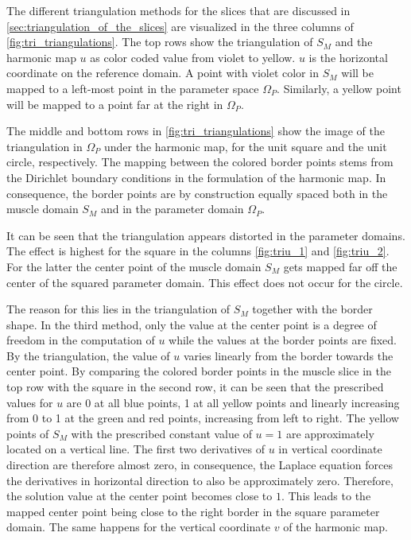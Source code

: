 The different triangulation methods for the slices that are discussed in \cref{sec:triangulation_of_the_slices} are visualized in the three columns of \cref{fig:tri_triangulations}. 
The top rows show the triangulation of $S_M$ and the harmonic map $u$ as color coded value from violet to yellow. $u$ is the horizontal coordinate on the reference domain. A point with violet color in $S_M$ will be mapped to a left-most point in the parameter space $\Omega_P$. Similarly, a yellow point will be mapped to a point far at the right in $\Omega_P$.

The middle and bottom rows in \cref{fig:tri_triangulations} show the image of the triangulation in $\Omega_P$ under the harmonic map, for the unit square and the unit circle, respectively. The mapping between the colored border points stems from the Dirichlet boundary conditions in the formulation of the harmonic map. In consequence, the border points are by construction equally spaced both in the muscle domain $S_M$ and in the parameter domain $\Omega_P$.

It can be seen that the triangulation appears distorted in the parameter domains. The effect is highest for the square in the columns \cref{fig:triu_1} and \cref{fig:triu_2}. For the latter the center point of the muscle domain $S_M$ gets mapped far off the center of the squared parameter domain. This effect does not occur for the circle.

The reason for this lies in the triangulation of $S_M$ together with the border shape. In the third method, only the value at the center point is a degree of freedom in the computation of $u$ while the values at the border points are fixed. By the triangulation, the value of $u$ varies linearly from the border towards the center point.
By comparing the colored border points in the muscle slice in the top row with the square in the second row, it can be seen that the prescribed values for $u$ are 0 at all blue points, 1 at all yellow points and linearly increasing from 0 to 1 at the green and red points, increasing from left to right.
The yellow points of $S_M$ with the prescribed constant value of $u=1$ are approximately located on a vertical line. The first two derivatives of $u$ in vertical coordinate direction are therefore almost zero, in consequence, the Laplace equation forces the derivatives in horizontal direction to also be approximately zero. Therefore, the solution value at the center point becomes close to $1$. This leads to the mapped center point being close to the right border in the square parameter domain. The same happens for the vertical coordinate $v$ of the harmonic map.

